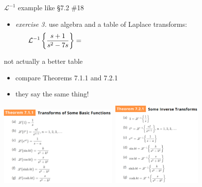 \documentclass[dvipsnames,colorlinks]{beamer}
\begin{document}
\begin{frame}{$\mathcal{L}^{-1}$ example like \S7.2 \#18}

\begin{itemize}
\item \emph{exercise 3.}  use algebra and a table of Laplace transforms:
    $$\LLi{\frac{s+1}{s^2-7s}} = \hspace{80mm}$$
\end{itemize}

\vspace{50mm}
\end{frame}


\begin{frame}{not actually a better table}

\begin{itemize}
\item compare Theorems 7.1.1 and 7.2.1
\item they say the same thing!
\end{itemize}

\mbox{\includegraphics[height=40mm]{figs/laplacetable.pdf} \qquad \includegraphics[height=42mm]{figs/inverselaplacetable.pdf}}

\end{frame}
\end{document}
